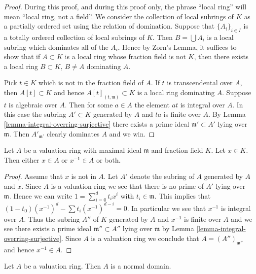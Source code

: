\begin{proof}
During this proof, and during this proof only, the phrase
``local ring'' will mean ``local ring, not a field''.
We consider the collection of local subrings
of $K$ as a partially ordered set using the relation of domination.
Suppose that $\{A_i\}_{i \in I}$ is a totally ordered
collection of local subrings of $K$. Then $B = \bigcup A_i$
is a local subring which dominates all of the $A_i$.
Hence by Zorn's Lemma, it suffices to show that if $A \subset K$
is a local ring whose fraction field is not $K$, then there
exists a local ring $B \subset K$, $B \not = A$ dominating $A$.

\medskip\noindent
Pick $t \in K$ which is not in the fraction field of $A$.
If $t$ is transcendental over $A$, then $A[t] \subset K$
and hence $A[t]_{(t, \mathfrak m)} \subset K$ is a local ring
dominating $A$.
Suppose $t$ is algebraic over $A$.
Then for some $a \in A$ the element $at$ is integral over $A$.
In this case the subring $A' \subset K$ generated by $A$ and
$ta$ is finite over $A$.
By Lemma \ref{lemma-integral-overring-surjective} there exists
a prime ideal $\mathfrak m' \subset A'$ lying over 
$\mathfrak m$. Then $A'_{\mathfrak m'}$ clearly dominates
$A$ and we win.
\end{proof}

\begin{lemma}
\label{lemma-valuation-ring-x-or-x-inverse}
Let $A$ be a valuation ring with maximal ideal $\mathfrak m$ and
fraction field $K$.
Let $x \in K$. Then either $x \in A$ or $x^{-1} \in A$ or both.
\end{lemma}

\begin{proof}
Assume that $x$ is not in $A$.
Let $A'$ denote the subring of $A$ generated by $A$ and $x$.
Since $A$ is a valuation ring we see that there is no prime
of $A'$ lying over $\mathfrak m$. Hence we can write
$1 = \sum_{i = 0}^d t_i x^i$ with $t_i \in \mathfrak m$.
This implies that $(1 - t_0) (x^{-1})^d - \sum t_i (x^{-1})^{d - i} = 0$.
In particular we see that $x^{-1}$ is integral over $A$.
Thus the subring $A''$ of $K$ generated by $A$ and $x^{-1}$ is
finite over $A$ and we see there exists a prime ideal
$\mathfrak m'' \subset A''$ lying over $\mathfrak m$ by
Lemma \ref{lemma-integral-overring-surjective}. Since $A$
is a valuation ring we conclude that $A = (A'')_{\mathfrak m''}$
and hence $x^{-1} \in A$.
\end{proof}

\begin{lemma}
\label{lemma-valuation-ring-normal}
Let $A$ be a valuation ring.
Then $A$ is a normal domain.
\end{lemma}

